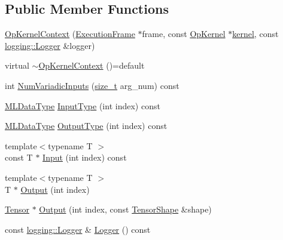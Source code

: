 \subsection*{Public Member Functions}
\begin{DoxyCompactItemize}
\item 
\mbox{\hyperlink{classonnxruntime_1_1OpKernelContext_a833fe4cfdf449be56ef3bab665774bff}{Op\+Kernel\+Context}} (\mbox{\hyperlink{classonnxruntime_1_1ExecutionFrame}{Execution\+Frame}} $\ast$frame, const \mbox{\hyperlink{classonnxruntime_1_1OpKernel}{Op\+Kernel}} $\ast$\mbox{\hyperlink{mkldnn_2nn_2pool_8cc_a1fd14bdce0b9db48a6bf8c6ce1320490}{kernel}}, const \mbox{\hyperlink{classonnxruntime_1_1logging_1_1Logger}{logging\+::\+Logger}} \&logger)
\item 
virtual \mbox{\hyperlink{classonnxruntime_1_1OpKernelContext_a84fd2b6aa991a81856913bee18e2231d}{$\sim$\+Op\+Kernel\+Context}} ()=default
\item 
int \mbox{\hyperlink{classonnxruntime_1_1OpKernelContext_a961585972b6d85e8500faf2e138d3aaa}{Num\+Variadic\+Inputs}} (\mbox{\hyperlink{mlasi_8h_a503efbc1c6e50825320ad909366b78ab}{size\+\_\+t}} arg\+\_\+num) const
\item 
\mbox{\hyperlink{namespaceonnxruntime_ad77d0a6e838ec7da5dc35fed5ee66b49}{M\+L\+Data\+Type}} \mbox{\hyperlink{classonnxruntime_1_1OpKernelContext_a06c1e42dcfddb17f96c9e31cc1185027}{Input\+Type}} (int index) const
\item 
\mbox{\hyperlink{namespaceonnxruntime_ad77d0a6e838ec7da5dc35fed5ee66b49}{M\+L\+Data\+Type}} \mbox{\hyperlink{classonnxruntime_1_1OpKernelContext_a253e5bdfb161a27eec52823dcc6f63ce}{Output\+Type}} (int index) const
\item 
{\footnotesize template$<$typename T $>$ }\\const T $\ast$ \mbox{\hyperlink{classonnxruntime_1_1OpKernelContext_a55aa066dae670496d009d642c69407d0}{Input}} (int index) const
\item 
{\footnotesize template$<$typename T $>$ }\\T $\ast$ \mbox{\hyperlink{classonnxruntime_1_1OpKernelContext_a6d56830ba7a73e38d8c5ca92699b8c69}{Output}} (int index)
\item 
\mbox{\hyperlink{classonnxruntime_1_1Tensor}{Tensor}} $\ast$ \mbox{\hyperlink{classonnxruntime_1_1OpKernelContext_a1aa7d10ea6fd4770151e30e3e6891cd9}{Output}} (int index, const \mbox{\hyperlink{classonnxruntime_1_1TensorShape}{Tensor\+Shape}} \&shape)
\item 
const \mbox{\hyperlink{classonnxruntime_1_1logging_1_1Logger}{logging\+::\+Logger}} \& \mbox{\hyperlink{classonnxruntime_1_1OpKernelContext_a510003379f7b247e102390cc1deb5c7c}{Logger}} () const

\end{DoxyCompactItemize}

